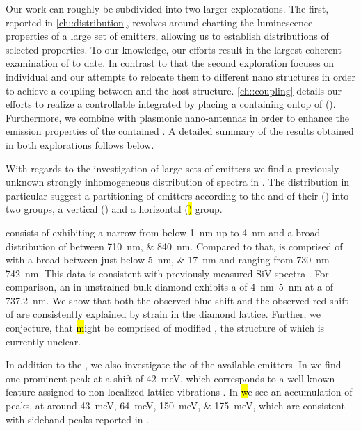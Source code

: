    Our work can roughly be subdivided into two larger explorations. The first, reported in \cref{ch::distribution}, revolves around charting the luminescence properties of a large set of emitters, allowing us to establish distributions of selected \siv properties. To our knowledge, our efforts result in the largest coherent examination of \sivs to date. In contrast to that the second exploration focuses on individual \nds and our attempts to relocate them to different nano structures in order to achieve a coupling between \sivs and the host structure. \cref{ch::coupling} details our efforts to realize a controllable integrated \sps by placing a \nd containing \sivs ontop of \vcsel (\VCSEL). Furthermore, we combine \nds with plasmonic nano-antennas in order to enhance the emission properties of the contained \sivs. A detailed summary of the results obtained in both explorations follows below.


   With regards to the investigation of large sets of emitters we find a previously unknown strongly inhomogeneous distribution of \siv spectra in \nds. The distribution in particular suggest a partitioning of emitters according to the \wl and \lw of their \zpls (\ZPL) into two groups, a vertical (\vl) and a horizontal (\hl) group.

   \Hl consists of \ZPLs exhibiting a narrow \lw from below \SI{1}{nm} up to \SI{4}{nm} and a broad distribution of \cwl between \SIlist{710;840}{nm}.
   Compared to that, \vl is comprised of \ZPLs with a broad \lw between just below \SIlist{5; 17}{nm} and \cwl ranging from \SIrange{730}{742}{nm}.
   This data is consistent with previously measured SiV spectra \cite{Benedikter2017a,Neu2012}.
   For comparison, an \siv in unstrained bulk diamond exhibits a \lw of \SIrange{4}{5}{nm} at a \cwl of \SI{737.2}{nm}\cite{Arend2016a,Dietrich2014}.
   We show that both the observed blue-shift and the observed red-shift of \vl are consistently explained by strain in the diamond lattice.
   Further, we conjecture, that \hl might be comprised of modified \sivs, the structure of which is currently unclear.

   In addition to the \zpl, we also investigate the \psb of the available emitters. In \vl we find one prominent peak at a shift of \SI{42}{meV}, which corresponds to a well-known feature assigned to non-localized lattice vibrations \cite{Larkins1971,Sternschulte1994}.
   In \hl we see an accumulation of peaks, at around \SIlist{43;64;150;175}{meV}, which are consistent with sideband peaks reported in \cite{Sternschulte1994,Zaitsev2001,Neu2011}.

